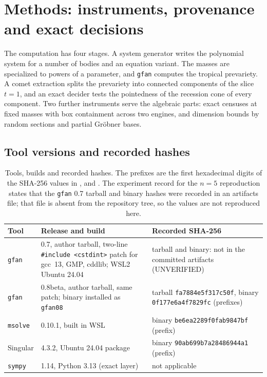 \documentclass[11pt]{article}
\theoremstyle{definition}
\theoremstyle{remark}
\begin{document}
\section{Methods: instruments, provenance and exact decisions}\label{sec:methods}

The computation has four stages. A system generator writes the polynomial system for a number of bodies and an equation variant. The
masses are specialized to powers of a parameter, and \texttt{gfan} computes the tropical prevariety. A comet extraction splits the prevariety
into connected components of the slice $t=1$, and an exact decider tests the pointedness of the recession cone of every component. Two
further instruments serve the algebraic parts: exact censuses at fixed masses with box containment across two engines, and dimension bounds by
random sections and partial Gr\"obner bases.

\subsection{Tool versions and recorded hashes}

\begin{table}[t]\centering\footnotesize
\begin{tabular}{@{}L{1.4cm}L{5.4cm}L{5.2cm}@{}}
\toprule
Tool & Release and build & Recorded SHA-256 \\
\midrule
\texttt{gfan} & 0.7, author tarball, two-line \texttt{\#include <cstdint>} patch for gcc~13, GMP, cddlib; WSL2 Ubuntu 24.04 & tarball and binary: not in the committed artifacts (UNVERIFIED) \\
\texttt{gfan} & 0.8beta, author tarball, same patch; binary installed as \texttt{gfan08} & tarball \texttt{fa7884e5f317c50f}, binary \texttt{0f177e6a4f7829fc} (prefixes) \\
\texttt{msolve} & 0.10.1, built in WSL & binary \texttt{be6ea2289f0fab9847bf} (prefix) \\
Singular & 4.3.2, Ubuntu 24.04 package & binary \texttt{90ab699b7a28486944a1} (prefix) \\
\texttt{sympy} & 1.14, Python 3.13 (exact layer) & not applicable \\
\bottomrule
\end{tabular}
\caption[Tools, builds and recorded hashes.]{Tools, builds and recorded hashes. The prefixes are the first hexadecimal digits
of the SHA-256 values in ,
 and . %
The experiment record for the $n=5$ reproduction states that the \texttt{gfan} 0.7 tarball
and binary hashes were recorded in an artifacts file; that file is absent from the
repository tree, so the values are not reproduced here.}\label{tab:tools}
\end{table}
\end{document}
